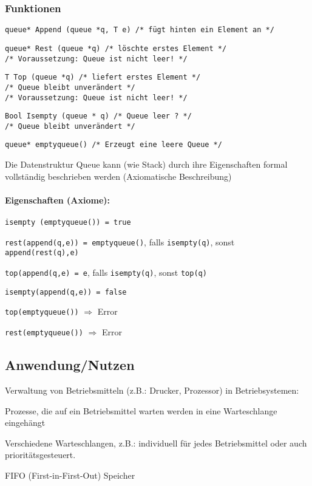 \subsubsection{Funktionen}
\begin{compactitem}
	\item \verb|queue* Append (queue *q, T e) /* fügt hinten ein Element an */|
	\item \verb|queue* Rest (queue *q) /* löschte erstes Element */|\\
	\verb|/* Voraussetzung: Queue ist nicht leer! */|
	\item \verb|T Top (queue *q) /* liefert erstes Element */|\\
	\verb|/* Queue bleibt unverändert */|\\
	\verb|/* Voraussetzung: Queue ist nicht leer! */|
	\item \verb|Bool Isempty (queue * q) /* Queue leer ? */|\\
	\verb|/* Queue bleibt unverändert */|
	\item \verb|queue* emptyqueue() /* Erzeugt eine leere Queue */|
\end{compactitem}

Die Datenstruktur Queue kann (wie Stack) durch ihre Eigenschaften formal vollständig beschrieben werden (Axiomatische Beschreibung)
\paragraph{Eigenschaften (Axiome):}
\begin{compactitem}
	\item \verb|isempty (emptyqueue()) = true|
	\item \verb|rest(append(q,e)) = emptyqueue()|, falls \verb|isempty(q)|, sonst \verb|append(rest(q),e)|
	\item \verb|top(append(q,e) = e|, falls \verb|isempty(q)|, sonst \verb|top(q)|
	\item \verb|isempty(append(q,e)) = false|
	\item \verb|top(emptyqueue())| $\Rightarrow$ Error
	\item \verb|rest(emptyqueue())| $\Rightarrow$ Error
\end{compactitem}

\subsection{Anwendung/Nutzen}
\begin{compactitem}
	\item Verwaltung von Betriebsmitteln (z.B.: Drucker, Prozessor) in Betriebsystemen:
	\begin{compactitem}
		\item Prozesse, die auf ein Betriebsmittel warten werden in eine Warteschlange eingehängt
		\item Verschiedene Warteschlangen, z.B.: individuell für jedes Betriebsmittel oder auch prioritätsgesteuert.
	\end{compactitem}
	\item FIFO (First-in-First-Out) Speicher
\end{compactitem}

